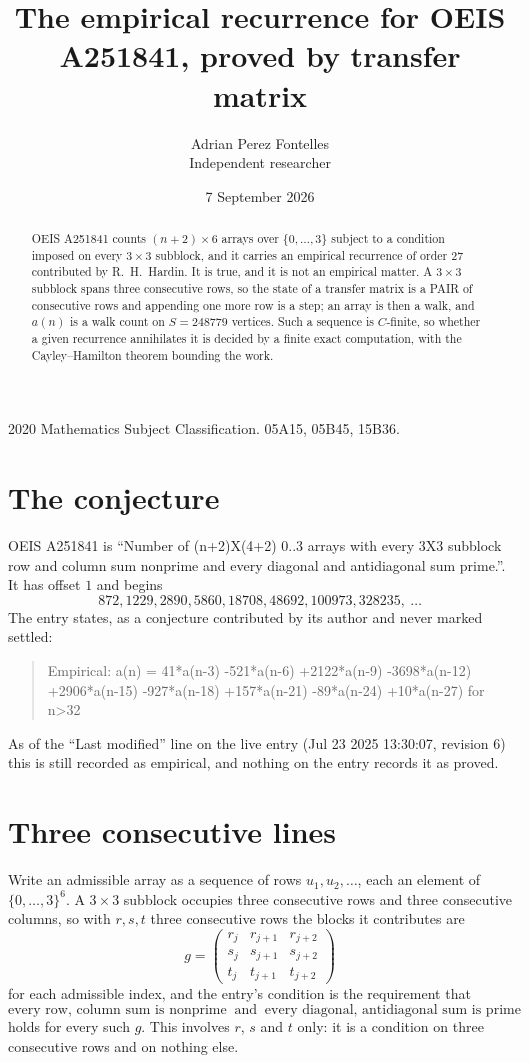 \documentclass[11pt,a4paper]{article}
\title{The empirical recurrence for OEIS A251841, proved by transfer matrix}
\author{Adrian Perez Fontelles\\ \small Independent researcher}
\date{7 September 2026}
\theoremstyle{plain}
\theoremstyle{definition}
\begin{document}
\maketitle

\begin{abstract}
OEIS A251841 counts $(n+2)\times6$ arrays over $\{0,\dots,3\}$ subject to a condition imposed on
every $3\times3$ subblock, and it carries an empirical recurrence of order $27$
contributed by R.~H.~Hardin. It is true, and it is not an empirical matter. A $3\times3$
subblock spans three consecutive rows, so the state of a transfer matrix is a PAIR of
consecutive rows and appending one more row is a step; an array is then a walk, and
$a(n)$ is a walk count on $S=248779$ vertices. Such a sequence is $C$-finite, so whether a given
recurrence annihilates it is decided by a finite exact computation, with the Cayley--Hamilton
theorem bounding the work.
\end{abstract}

\noindent\small 2020 Mathematics Subject Classification. 05A15, 05B45, 15B36.\normalsize

\section{The conjecture}

OEIS A251841 is ``Number of (n+2)X(4+2) 0..3 arrays with every 3X3 subblock row and column sum nonprime and every diagonal and antidiagonal sum prime.''. It has offset $1$ and begins
\[
872, 1229, 2890, 5860, 18708, 48692, 100973, 328235,\ \dots
\]
The entry states, as a conjecture contributed by its author and never marked settled:
\begin{quote}
Empirical: a(n) = 41*a(n-3) -521*a(n-6) +2122*a(n-9) -3698*a(n-12) +2906*a(n-15) -927*a(n-18) +157*a(n-21) -89*a(n-24) +10*a(n-27) for n>32
\end{quote}
As of the ``Last modified'' line on the live entry (Jul 23 2025 13:30:07, revision 6) this is still
recorded as empirical, and nothing on the entry records it as proved.

\section{Three consecutive lines}

Write an admissible array as a sequence of rows $u_1,u_2,\dots$, each an element of
$\{0,\dots,3\}^{6}$. A $3\times3$ subblock occupies three consecutive rows and
three consecutive columns, so with $r,s,t$ three consecutive rows the blocks it
contributes are
\[
g=\begin{pmatrix}r_j&r_{j+1}&r_{j+2}\\ s_j&s_{j+1}&s_{j+2}\\ t_j&t_{j+1}&t_{j+2}\end{pmatrix}
\]
for each admissible index, and the entry's condition is the requirement that
\[
\text{every row, column sum is nonprime}\ \text{ and }\ \text{every diagonal, antidiagonal sum is prime}
\]
holds for every such $g$. This involves $r$, $s$ and $t$ only: it is a condition on
three consecutive rows and on nothing else.
\end{document}
